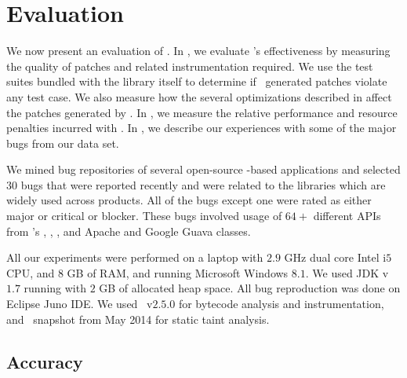 \section{Evaluation}
\label{sec:results}

We now present an evaluation of \tool. In , we evaluate
\tool's effectiveness by measuring the quality of patches and related
instrumentation required. We use the test suites bundled with the library itself
to determine if \tool\ generated patches violate any test case. We also measure
how the several optimizations described in  affect
the patches generated by \tool. In , we measure the relative
performance and resource penalties incurred with \tool. In
, we describe our experiences with some of the major bugs
from our data set.


 We mined bug repositories of several open-source
\java-based applications and selected $30$ bugs that were reported recently
and were related to the libraries which are widely used across products. All of the
bugs except one were rated as either major or critical or blocker.
These bugs involved usage of $64+$ different APIs from
\java's , , , and Apache
 and Google Guava  classes. 

 All our experiments were performed on a laptop
with $2.9$ GHz dual core Intel i$5$ CPU, and $8$ GB of RAM, and running
Microsoft Windows $8.1$. We used JDK v$1.7$ running with $2$ GB of allocated
heap space. All bug reproduction was done on Eclipse Juno IDE. We used \soot\
v$2.5.0$ for bytecode analysis and instrumentation, and \infoflow\ snapshot from
May 2014 for static taint analysis.

\subsection{Accuracy}
\label{sub:accuracy}

